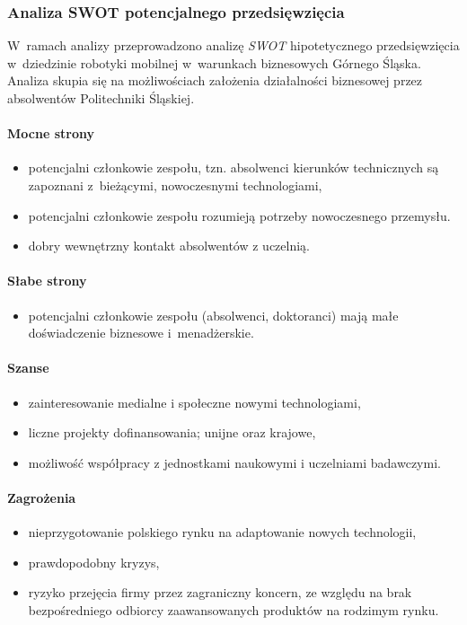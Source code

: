 \subsubsection{Analiza SWOT potencjalnego przedsięwzięcia}
W~ramach analizy przeprowadzono analizę \textit{SWOT} hipotetycznego
przedsięwzięcia w~dziedzinie robotyki mobilnej w~warunkach biznesowych Górnego
Śląska.
Analiza skupia się na możliwościach założenia działalności biznesowej przez
absolwentów Politechniki Śląskiej.

\paragraph{Mocne strony}
\begin{itemize}
	\item potencjalni członkowie zespołu, tzn. absolwenci kierunków technicznych
		  są zapoznani z~bieżącymi, nowoczesnymi technologiami,
	\item potencjalni członkowie zespołu rozumieją potrzeby nowoczesnego
		  przemysłu.
	\item dobry wewnętrzny kontakt absolwentów z uczelnią.
\end{itemize}

\paragraph{Słabe strony}
\begin{itemize}
	\item potencjalni członkowie zespołu (absolwenci, doktoranci) mają małe
          doświadczenie biznesowe i~menadżerskie.
\end{itemize}

\paragraph{Szanse}
\begin{itemize}
	\item zainteresowanie medialne i społeczne nowymi technologiami,
	\item liczne projekty dofinansowania; unijne oraz krajowe,
    \item możliwość współpracy z jednostkami naukowymi i uczelniami badawczymi.
\end{itemize}

\paragraph{Zagrożenia}
\begin{itemize}
	\item nieprzygotowanie polskiego rynku na adaptowanie nowych technologii,
	\item prawdopodobny kryzys,
	\item ryzyko przejęcia firmy przez zagraniczny koncern, ze względu na brak
          bezpośredniego odbiorcy zaawansowanych produktów na rodzimym rynku.
\end{itemize}